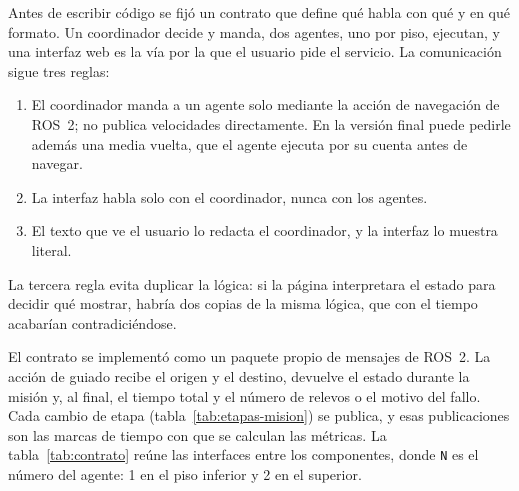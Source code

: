 Antes de escribir código se fijó un contrato que define qué habla con qué y en qué formato. Un coordinador decide y manda, dos agentes, uno
por piso, ejecutan, y una interfaz web es la vía por la que el usuario pide el servicio. La comunicación sigue tres reglas:

\begin{enumerate}[leftmargin=*]
  \item El coordinador manda a un agente solo mediante la acción de navegación
    de ROS~2; no publica velocidades directamente. En la versión final puede
    pedirle además una media vuelta, que el agente ejecuta por su cuenta antes de navegar.
  \item La interfaz habla solo con el coordinador, nunca con los agentes.
  \item El texto que ve el usuario lo redacta el coordinador, y la interfaz lo
    muestra literal.
\end{enumerate}

La tercera regla evita duplicar la lógica: si la página interpretara el estado para decidir qué mostrar, habría dos copias de la misma lógica, que con el tiempo acabarían contradiciéndose.

El contrato se implementó como un paquete propio de mensajes de ROS~2. La acción
de guiado recibe el origen y el destino, devuelve el estado durante la misión y,
al final, el tiempo total y el número de relevos o el motivo del fallo. Cada
cambio de etapa (tabla~\ref{tab:etapas-mision}) se publica, y esas publicaciones
son las marcas de tiempo con que se calculan las métricas. La tabla~\ref{tab:contrato} reúne las interfaces entre los componentes, donde \texttt{N} es el número del agente: 1 en el piso inferior y 2 en el superior.

